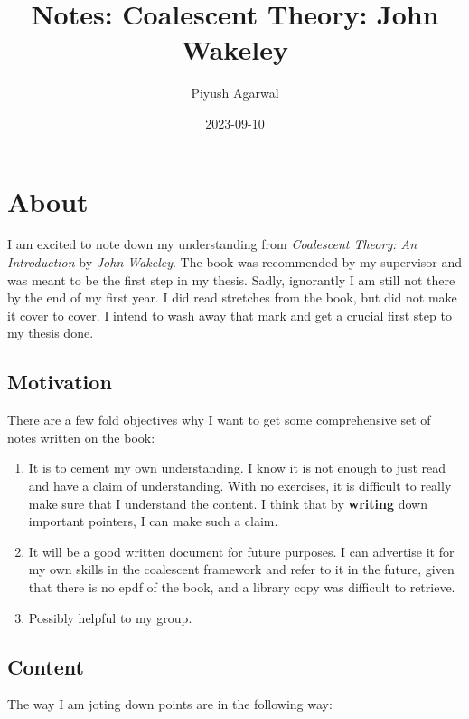 \documentclass[
]{book}
\title{Notes: Coalescent Theory: John Wakeley}
\author{Piyush Agarwal}
\date{2023-09-10}
\theoremstyle{definition}
\theoremstyle{definition}
\theoremstyle{definition}
\theoremstyle{definition}
\theoremstyle{remark}
\begin{document}
\maketitle

{
\setcounter{tocdepth}{1}
\tableofcontents
}
\hypertarget{about}{%
\chapter{About}\label{about}}

I am excited to note down my understanding from \emph{Coalescent Theory: An Introduction} by \emph{John Wakeley}. The book was recommended by my supervisor and was meant to be the first step in my thesis. Sadly, ignorantly I am still not there by the end of my first year. I did read stretches from the book, but did not make it cover to cover. I intend to wash away that mark and get a crucial first step to my thesis done.

\hypertarget{motivation}{%
\section{Motivation}\label{motivation}}

There are a few fold objectives why I want to get some comprehensive set of notes written on the book:

\begin{enumerate}
\def\labelenumi{\arabic{enumi}.}
\item
  It is to cement my own understanding. I know it is not enough to just read and have a claim of understanding. With no exercises, it is difficult to really make sure that I understand the content. I think that by \textbf{writing} down important pointers, I can make such a claim.
\item
  It will be a good written document for future purposes. I can advertise it for my own skills in the coalescent framework and refer to it in the future, given that there is no epdf of the book, and a library copy was difficult to retrieve.
\item
  Possibly helpful to my group.
\end{enumerate}

\hypertarget{content}{%
\section{Content}\label{content}}

The way I am joting down points are in the following way:
\end{document}
